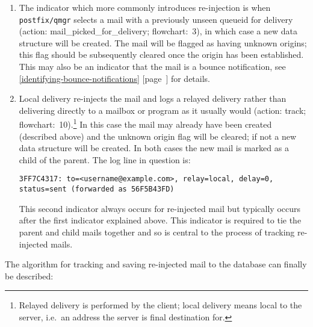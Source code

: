 \documentclass[a4paper,12pt,draft]{article}
\newcommand{\refwithpage}[1]{%
    \empty{}\ref{#1} [page~\pageref{#1}]%
}
\newcommand{\sectionref}[1]{%
    \textsection{}\refwithpage{#1}%
}
\newcommand{\daemon}[1]{%
    \texttt{postfix/#1}%
}
\begin{document}
\begin{enumerate}

    \item The indicator which more commonly introduces re-injection is when
        \daemon{qmgr} selects a mail with a previously unseen queueid for
        delivery (action: mail\_picked\_for\_delivery; flowchart:~3), in
        which case a new data structure will be created.  The mail will be
        flagged as having unknown origins; this flag should be subsequently
        cleared once the origin has been established.  This may also be an
        indicator that the mail is a bounce notification, see
        \sectionref{identifying-bounce-notifications} for details.

    \item Local delivery re-injects the mail and logs a relayed delivery
        rather than delivering directly to a mailbox or program as it
        usually would (action: track; flowchart:~10).\footnote{Relayed
        delivery is performed by the \SMTP{} client; local delivery means
        local to the server, i.e.\ an address the server is final
        destination for.} In this case the mail may already have been
        created (described above) and the unknown origin flag will be
        cleared; if not a new data structure will be created.  In both
        cases the new mail is marked as a child of the parent.  The log
        line in question is:

        \texttt{3FF7C4317: to=<username@example.com>, relay=local, \newline
        delay=0, status=sent (forwarded as 56F5B43FD)}

        This second indicator always occurs for re-injected mail but
        typically occurs after the first indicator explained above.  This
        indicator is required to tie the parent and child mails together
        and so is central to the process of tracking re-injected mails.

\end{enumerate}

The algorithm for tracking and saving re-injected mail to the database can
finally be described:
\end{document}
